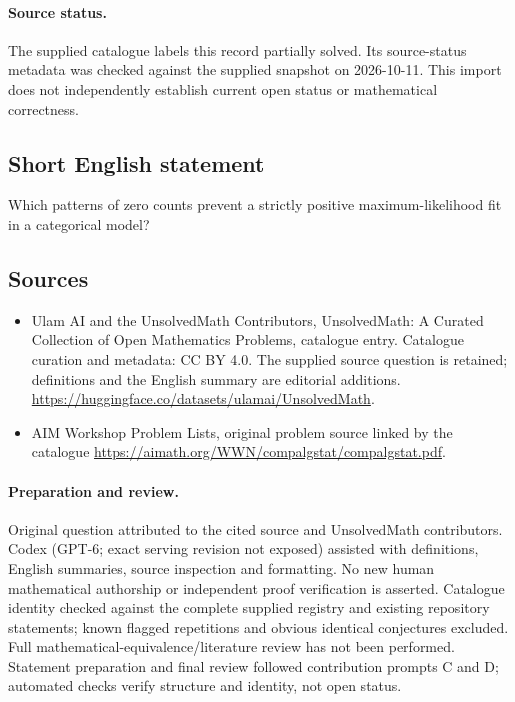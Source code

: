 \documentclass[11pt]{article}
\begin{document}
\paragraph{Source status.}
The supplied catalogue labels this record partially solved. Its source-status metadata was checked against the supplied snapshot on 2026-10-11. This import does not independently establish current open status or mathematical correctness.
\subsection{Short English statement}
Which patterns of zero counts prevent a strictly positive maximum-likelihood fit in a categorical model?
\subsection{Sources}
\begin{itemize}
\item[\hypertarget{source:statement:1}{S1}] Ulam AI and the UnsolvedMath Contributors, UnsolvedMath: A Curated Collection of Open Mathematics Problems, catalogue entry. Catalogue curation and metadata: CC BY 4.0. The supplied source question is retained; definitions and the English summary are editorial additions.
\url{https://huggingface.co/datasets/ulamai/UnsolvedMath}.
\item[\hypertarget{source:statement:2}{S2}] AIM Workshop Problem Lists, original problem source linked by the catalogue
\url{https://aimath.org/WWN/compalgstat/compalgstat.pdf}.
\end{itemize}
\paragraph{Preparation and review.}
Original question attributed to the cited source and UnsolvedMath contributors. Codex (GPT-6; exact serving revision not exposed) assisted with definitions, English summaries, source inspection and formatting. No new human mathematical authorship or independent proof verification is asserted. Catalogue identity checked against the complete supplied registry and existing repository statements; known flagged repetitions and obvious identical conjectures excluded. Full mathematical-equivalence/literature review has not been performed. Statement preparation and final review followed contribution prompts C and D; automated checks verify structure and identity, not open status.
\label{end:statement}
\end{document}
